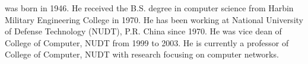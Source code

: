 \documentclass[preprint]{elsarticle}
\begin{document}
  was born in 1946. He received the B.S. degree in computer science from Harbin Military Engineering College in 1970. He has been working at National University of Defense Technology (NUDT), P.R. China since 1970. He was vice dean of College of Computer, NUDT from 1999 to 2003. He is currently a professor of College of Computer, NUDT with research focusing on computer networks.
\end{document}
